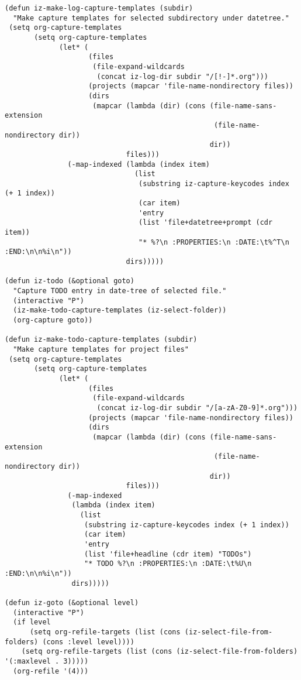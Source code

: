 \documentclass[nofonts]{tufte-handout}
\begin{document}
\begin{verbatim}
(defun iz-make-log-capture-templates (subdir)
  "Make capture templates for selected subdirectory under datetree."
 (setq org-capture-templates
       (setq org-capture-templates
             (let* (
                    (files
                     (file-expand-wildcards
                      (concat iz-log-dir subdir "/[!-]*.org")))
                    (projects (mapcar 'file-name-nondirectory files))
                    (dirs
                     (mapcar (lambda (dir) (cons (file-name-sans-extension
                                                  (file-name-nondirectory dir))
                                                 dir))
                             files)))
               (-map-indexed (lambda (index item)
                               (list
                                (substring iz-capture-keycodes index (+ 1 index))
                                (car item)
                                'entry
                                (list 'file+datetree+prompt (cdr item))
                                "* %?\n :PROPERTIES:\n :DATE:\t%^T\n :END:\n\n%i\n"))
                             dirs)))))

(defun iz-todo (&optional goto)
  "Capture TODO entry in date-tree of selected file."
  (interactive "P")
  (iz-make-todo-capture-templates (iz-select-folder))
  (org-capture goto))

(defun iz-make-todo-capture-templates (subdir)
  "Make capture templates for project files"
 (setq org-capture-templates
       (setq org-capture-templates
             (let* (
                    (files
                     (file-expand-wildcards
                      (concat iz-log-dir subdir "/[a-zA-Z0-9]*.org")))
                    (projects (mapcar 'file-name-nondirectory files))
                    (dirs
                     (mapcar (lambda (dir) (cons (file-name-sans-extension
                                                  (file-name-nondirectory dir))
                                                 dir))
                             files)))
               (-map-indexed
                (lambda (index item)
                  (list
                   (substring iz-capture-keycodes index (+ 1 index))
                   (car item)
                   'entry
                   (list 'file+headline (cdr item) "TODOs")
                   "* TODO %?\n :PROPERTIES:\n :DATE:\t%U\n :END:\n\n%i\n"))
                dirs)))))

(defun iz-goto (&optional level)
  (interactive "P")
  (if level
      (setq org-refile-targets (list (cons (iz-select-file-from-folders) (cons :level level))))
    (setq org-refile-targets (list (cons (iz-select-file-from-folders) '(:maxlevel . 3)))))
  (org-refile '(4)))


\end{verbatim}
\end{document}
